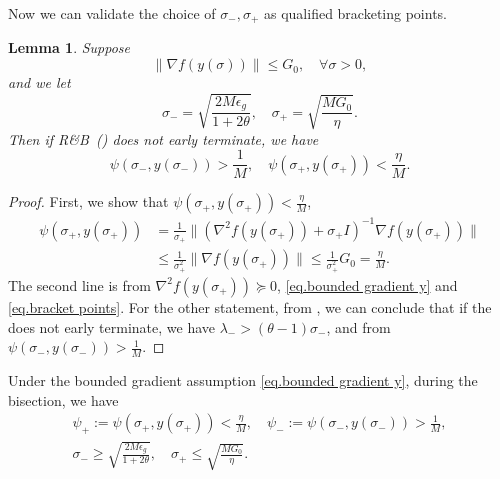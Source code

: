 \documentclass{article}
\newtheorem{lemma}[theorem]{Lemma}
\numberwithin{equation}{section}
\numberwithin{equation}{section}
\begin{document}
Now we can validate the choice of $\sigma_-,\sigma_+$ as qualified bracketing points.
\begin{lemma}
    \label{lem.bracketing points}
    Suppose
    \begin{equation}\label{eq.bounded gradient y}
        \|\nabla f(y(\sigma))\|\leq G_0, \quad \forall \sigma>0,
    \end{equation}
    and we let
    \begin{equation}
        \label{eq.bracket points}
        \sigma_- = \sqrt{\frac{2M\epsilon_g}{1+2\theta}}, \quad \sigma_+ = \sqrt{\frac{MG_0}{\eta}}.
    \end{equation}
    Then if \textnormal{R\&B}~() does not early terminate, we have
    \begin{equation*}
        \psi\left (\sigma_-,y(\sigma_-)\right) >\frac{1}{M}, \quad \psi\left (\sigma_+,y(\sigma_+)\right) <\frac{\eta}{M}.
    \end{equation*}
\end{lemma}
\begin{proof}
    First, we show that $\psi(\sigma_+,y(\sigma_+))<\frac{\eta}{M}$,
    \begin{equation*}
        \begin{aligned}
            \psi(\sigma_+,y(\sigma_+)) & = \frac{1}{\sigma_+} \|(\nabla^2 f(y(\sigma_+))+\sigma_+ I)^{-1}\nabla f(y(\sigma_+))\|            \\
                                       & \leq \frac{1}{\sigma_+^2}\|\nabla f(y(\sigma_+))\| \leq \frac{1}{\sigma_+^2} G_0 = \frac{\eta}{M}.
        \end{aligned}
    \end{equation*}
    The second line is from $\nabla^2 f(y(\sigma_+))\succeq 0$, \eqref{eq.bounded gradient y} and \eqref{eq.bracket points}. For the other statement, from , we can conclude that if the  does not early terminate, we have $\lambda_- > (\theta-1)\sigma_-$, and from  $\psi(\sigma_-,y(\sigma_-))>\frac{1}{M}.$
\end{proof}
Under the bounded gradient assumption \eqref{eq.bounded gradient y}, during the bisection, we have
\begin{gather}
    \label{eq.bisection condition}
    \psi_+:=\psi(\sigma_+,y(\sigma_+))<\frac{\eta}{M}, \quad \psi_-:=\psi(\sigma_-,y(\sigma_-))>\frac{1}{M},\\
    \label{eq.bracket points condition} \sigma_- \geq \sqrt{\frac{2M\epsilon_g}{1+2\theta}}, \quad \sigma_+ \leq \sqrt{\frac{MG_0}{\eta}}.
\end{gather}
\end{document}
